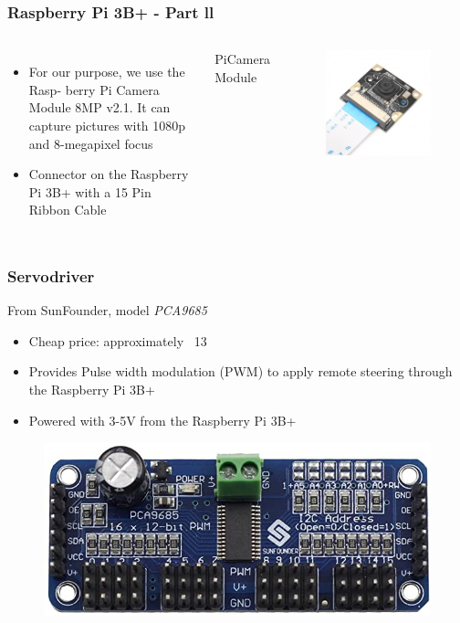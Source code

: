 \documentclass{beamer}
\begin{document}
%
%
\begin{frame}
\frametitle{Raspberry Pi 3B+ - Part ll}
\begin{columns}[c] %
\begin{itemize}
\item For our purpose, we use the Rasp- berry Pi Camera Module 8MP v2.1. It can capture pictures with 1080p and 8-megapixel focus \\
\item Connector on the Raspberry Pi 3B+ with a 15 Pin Ribbon Cable
\end{itemize}
PiCamera Module
\begin{figure}
\includegraphics[width=0.7\linewidth]{photo/camera.jpg}
\end{figure}
\end{columns}
\end{frame}
%
%
\begin{frame}
\frametitle{Servodriver}
From SunFounder, model \textit{PCA9685}
\begin{itemize}
\item Cheap price: approximately ~13
\item Provides Pulse width modulation (PWM) to apply remote steering through the Raspberry Pi 3B+
\item Powered with 3-5V from the Raspberry Pi 3B+
\end{itemize}
\begin{figure}
\includegraphics[width=0.4\linewidth]{photo/sunfounder.jpeg}
\end{figure}
\end{frame}
\end{document}

